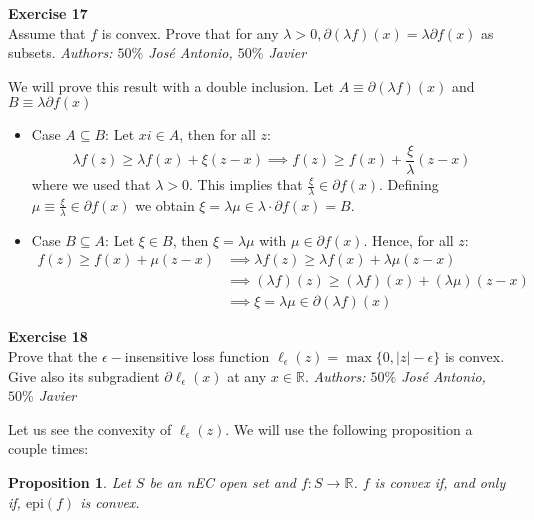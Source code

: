 \documentclass[11pt,table]{article}
\newenvironment{problem}[2][Exercise]
{ \begin{mdframed}[backgroundcolor=gray!20] \textbf{#1 #2} \\}
	{\hspace{0.0cm}\newline\newline \emph{Authors: \(50\%\) José Antonio, \(50\%\) Javier}  \end{mdframed}}
\newtheorem{nprop}{Proposition}
\newcommand\abs[1]{\lvert#1\rvert}
\newcommand\R{\mathbb R}
\begin{document}
\begin{problem}{17}
Assume that \( f \)  is convex. Prove that for any \( \lambda > 0, \partial(\lambda f)(x) = \lambda \partial f(x) \) as subsets.
\end{problem}

We will prove this result with a double inclusion. Let $A \equiv \partial(\lambda f)(x)$ and $B \equiv \lambda \partial f(x)$

\begin{itemize}
	\item Case $A \subseteq B$: Let $xi \in A$, then for all $z$:
	      \[
		      \lambda f(z) \ge \lambda f(x) + \xi (z-x) \implies f(z) \ge f(x) + \frac{\xi}{\lambda}(z-x)
	      \]
	      where we used that $\lambda > 0$. This implies that $\frac{\xi}{\lambda} \in \partial f(x)$. Defining $\mu \equiv \frac{\xi}{\lambda} \in \partial f(x)$ we obtain $\xi = \lambda \mu \in \lambda \cdot \partial f(x) = B$.

	\item Case $B \subseteq A$: Let $\xi \in B$, then $\xi = \lambda \mu$ with $\mu \in \partial f(x)$. Hence, for all $z$:
	      \begin{align*}
		      f(z) \ge f(x) + \mu(z-x) & \implies \lambda f(z) \ge \lambda f(x) + \lambda\mu(z-x)       \\
		                               & \implies (\lambda f)(z) \ge (\lambda f)(x) + (\lambda\mu)(z-x) \\
		                               & \implies \xi = \lambda \mu \in \partial(\lambda f)(x)
	      \end{align*}
\end{itemize}

\begin{problem}{18}
Prove that the \(\epsilon-\)insensitive loss function \(\ell_\epsilon(z) = \max\{0,\abs{z} - \epsilon\}\) is convex. Give also its subgradient \(\partial \ell_\epsilon(x)\) at any \(x \in \R\).
\end{problem}


Let us see the convexity of \(\ell_\epsilon(z)\). We will use the following proposition a couple times:
\begin{nprop}
	Let \(S\) be an nEC open set and \(f:S\to \R\). \(f\) is convex if, and only if, \(\text{epi}(f)\) is convex.
\end{nprop}
\end{document}
